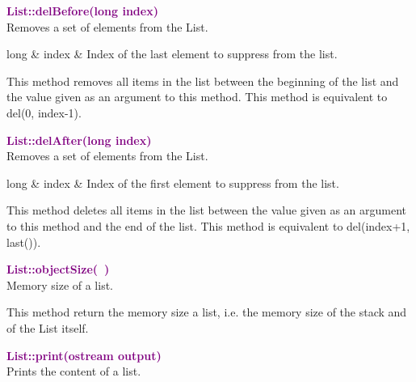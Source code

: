 \textcolor{purple}{\textbf{List::delBefore(long index)}}\label{List::delBefore(long index)}\\
Removes a set of elements from the List.

\begin{tcolorbox}[width=\textwidth,myArgs,tabularx={ll|R}]
long & index & Index of the last element to suppress from the list.
\end{tcolorbox}

This method removes all items in the list between the beginning of the list and the value given as an argument to this method.
This method is equivalent to del(0, index-1).

\textcolor{purple}{\textbf{List::delAfter(long index)}}\label{List::delAfter(long index)}\\
Removes a set of elements from the List.

\begin{tcolorbox}[width=\textwidth,myArgs,tabularx={ll|R}]
long & index & Index of the first element to suppress from the list.
\end{tcolorbox}

This method deletes all items in the list between the value given as an argument to this method and the end of the list.
This method is equivalent to del(index+1, last()).

\textcolor{purple}{\textbf{List::objectSize(~)}}\label{List::objectSize()}\\
Memory size of a list.

This method return the memory size a list, i.e. the memory size of the stack and of the List itself.

\textcolor{purple}{\textbf{List::print(ostream output)}}\label{List::print(ostream output)}\\
Prints the content of a list.

